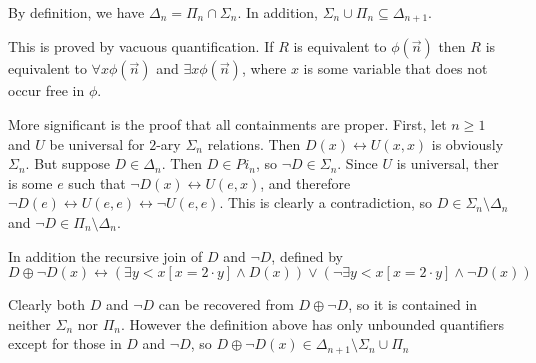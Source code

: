 \documentclass[12pt]{article}
\begin{document}
By definition, we have $\Delta_n=\Pi_n\cap \Sigma_n$.  In addition, $\Sigma_n\cup\Pi_n\subseteq \Delta_{n+1}$.

This is proved by vacuous quantification.  If $R$ is equivalent to $\phi(\vec{n})$ then $R$ is equivalent to $\forall x\phi(\vec{n})$ and $\exists x\phi(\vec{n})$, where $x$ is some variable that does not occur free in $\phi$.

More significant is the proof that all containments are proper.  First, let $n\geq 1$ and $U$ be universal for $2$-ary $\Sigma_n$ relations.  Then $D(x)\leftrightarrow U(x,x)$ is obviously $\Sigma_n$.  But suppose $D\in \Delta_n$.  Then $D\in Pi_n$, so $\neg D\in\Sigma_n$. Since $U$ is universal, ther is some $e$ such that $\neg D(x)\leftrightarrow U(e,x)$, and therefore $\neg D(e)\leftrightarrow U(e,e)\leftrightarrow \neg U(e,e)$.  This is clearly a contradiction, so $D\in\Sigma_n\setminus\Delta_n$ and $\neg D\in\Pi_n\setminus\Delta_n$.

In addition the recursive join of $D$ and $\neg D$, defined by 
$$D\oplus\neg D(x)\leftrightarrow (\exists y<x[x=2\cdot y]\wedge D(x)) \vee (\neg\exists y<x[x=2\cdot y]\wedge \neg D(x))$$

Clearly both $D$ and $\neg D$ can be recovered from $D\oplus\neg D$, so it is contained in neither $\Sigma_n$ nor $\Pi_n$.  However the definition above has only unbounded quantifiers except for those in $D$ and $\neg D$, so $D\oplus\neg D(x)\in \Delta_{n+1}\setminus\Sigma_n\cup\Pi_n$
\end{document}
